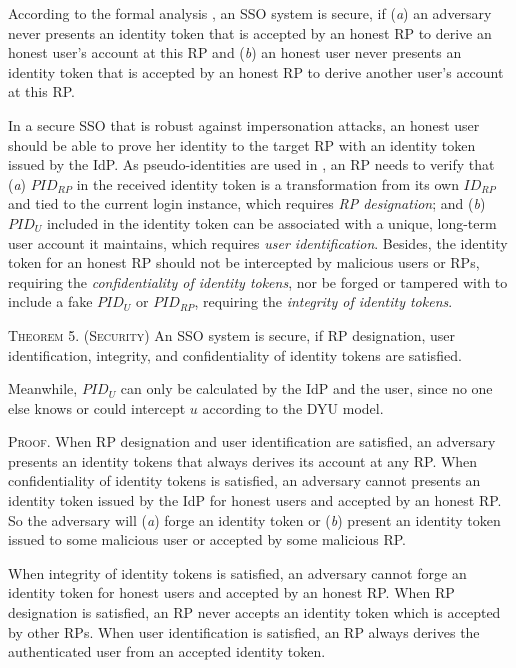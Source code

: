 {According to the formal analysis \cite{SPRESSO,FettKS14},
    an SSO system is secure, if (\emph{a}) an adversary never presents an identity token that is accepted by an honest RP to derive an honest user's account at this RP
    and (\emph{b}) an honest user never presents an identity token that is accepted by an honest RP to derive another user's account at this RP.

In a secure SSO that is robust against impersonation attacks, an honest user should be able to prove her identity to the target RP with an identity token issued by the IdP. As pseudo-identities are used in \usso, an RP needs to verify that ({\em a}) $PID_{RP}$ in the received identity token is a transformation from its own $ID_{RP}$ and tied to the current login instance, which requires {\em RP designation}; and ({\em b}) $PID_U$ included in the identity token can be associated with a unique, long-term user account it maintains, which requires {\em user identification}. Besides, the identity token for an honest RP should not be intercepted by malicious users or RPs, requiring the {\em confidentiality of identity tokens}, nor be forged or tampered with to include a fake $PID_U$ or $PID_{RP}$, requiring the {\em integrity of identity tokens}.

\vspace{1mm}
\noindent\textsc{Theorem 5. (Security)} {An SSO system is secure,
    if RP designation, user identification, integrity, and confidentiality of identity tokens are satisfied.}

\vspace{1mm}
\vspace{1mm}
\vspace{1mm}
Meanwhile, $PID_U$ can only be calculated by the IdP and the user, since no one else knows or could intercept $u$ according to the DYU model. \oldc

\vspace{0.75mm}
\noindent\textsc{Proof.}
When RP designation and user identification are satisfied,
    an adversary presents an identity tokens that always derives its account at any RP.
When confidentiality of identity tokens is satisfied,
    an adversary cannot presents an identity token issued by the IdP for honest users and accepted by an honest RP.
%
So the adversary will (\emph{a}) forge an identity token or (\emph{b}) present an identity token issued to some malicious user or accepted by some malicious RP.

When integrity of identity tokens is satisfied,
    an adversary cannot forge an identity token for honest users and accepted by an honest RP.
When RP designation is satisfied, an RP never accepts an identity token which is accepted by other RPs.
When user identification is satisfied, an RP always derives the authenticated user from an accepted identity token.

}
